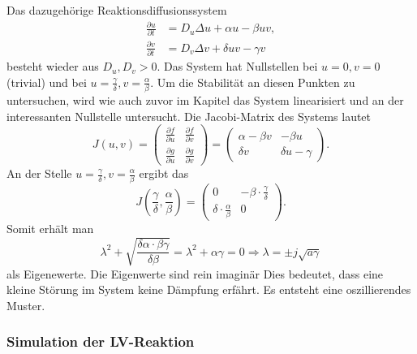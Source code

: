 Das dazugehörige Reaktionsdiffusionssystem
\begin{align}
    \frac{\partial u}{\partial t} &= D_u \Delta u + \alpha u - \beta u v, \\
    \frac{\partial v}{\partial t} &= D_v \Delta v + \delta u v - \gamma v
    \label{reaktdiff:equation:lvsys}
\end{align}
besteht wieder aus \(D_u,D_v > 0\).
Das System hat Nullstellen bei  \(u = 0,v = 0\) (trivial) und bei \(u = \frac{\gamma}{\delta}, v = \frac{\alpha}{\beta}\).
Um die Stabilität an diesen Punkten zu untersuchen, wird wie auch zuvor im Kapitel das System linearisiert und an der interessanten Nullstelle untersucht.
Die Jacobi-Matrix des Systems lautet
\begin{equation}
        J(u,v) =
        \begin{pmatrix}
        \frac{\partial f}{\partial u} & \frac{\partial f}{\partial v} \\
        \frac{\partial g}{\partial u} & \frac{\partial g}{\partial v}
        \end{pmatrix}
        =
        \begin{pmatrix}
        \alpha - \beta v & -\beta u \\
        \delta v & \delta u - \gamma
        \end{pmatrix}.
\end{equation}
An der Stelle \(u = \frac{\gamma}{\delta}, v = \frac{\alpha}{\beta}\) ergibt das
\begin{equation}
         J\left(\frac{\gamma}{\delta},\frac{\alpha}{\beta}\right) =
        \begin{pmatrix}
        0 & -\beta \cdot\frac{\gamma}{\delta} \\
        \delta \cdot \frac{\alpha}{\beta} & 0
        \end{pmatrix}. 
\end{equation}
Somit erhält man
\begin{equation}
    \lambda^2 + \sqrt{\frac{\delta \alpha \cdot \beta \gamma}{\delta \beta}}
     = 
     \lambda^2 + \alpha \gamma = 0 
     \Rightarrow
     \lambda = \pm j \sqrt{a\gamma}
\end{equation}
als Eigenewerte.
Die Eigenwerte sind rein imaginär
Dies bedeutet, dass eine kleine Störung im System keine Dämpfung erfährt.
Es entsteht eine oszillierendes Muster.

\subsubsection{Simulation der LV-Reaktion}

